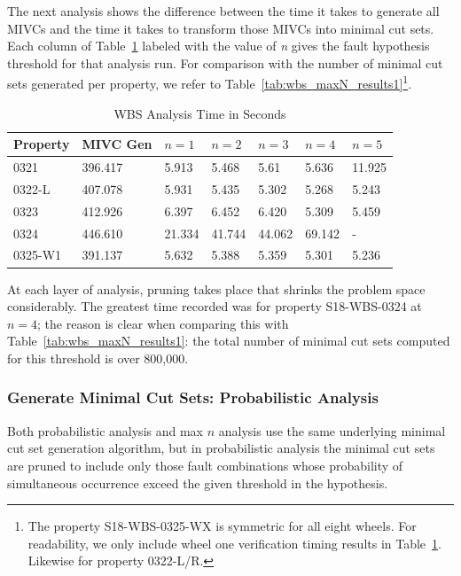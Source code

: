 The next analysis shows the difference between the time it takes to generate all MIVCs and the time it takes to transform those MIVCs into minimal cut sets. Each column of Table~\ref{tab:wbs_mincut1} labeled with the value of \textit{n} gives the fault hypothesis threshold for that analysis run. For comparison with the number of minimal cut sets generated per property, we refer to Table~\ref{tab:wbs_maxN_results1}\footnote{The property S18-WBS-0325-WX is symmetric for all eight wheels. For readability, we only include wheel one verification timing results in Table~\ref{tab:wbs_mincut1}. Likewise for property 0322-L/R.}.
\begin{table}[htbp]
\begin{center}
    \begin{tabular}{ | l | l | l | l | l | l | l |}
    \hline
    \textbf{Property} &  MIVC Gen & $n=1$ & $n=2$ & $n=3$ & $n=4$ & $n=5$     \\ \hline \hline
    0321 & 396.417 & 5.913 & 5.468 & 5.61 & 5.636 & 11.925  \\ \hline
    0322-L  & 407.078 & 5.931 & 5.435 & 5.302 & 5.268 & 5.243 \\ \hline
    0323 & 412.926 & 6.397 & 6.452 & 6.420  & 5.309 & 5.459\\ \hline
    0324 & 446.610 & 21.334 & 41.744 & 44.062 & 69.142 & -\\ \hline
    0325-W1 & 391.137 & 5.632 & 5.388 &5.359 &5.301 & 5.236 \\ \hline
    \end{tabular}
    \caption{WBS Analysis Time in Seconds}
    \label{tab:wbs_mincut1}
    \end{center}
\end{table}
At each layer of analysis, pruning takes place that shrinks the problem space considerably. The greatest time recorded was for property S18-WBS-0324 at $n = 4$; the reason is clear when comparing this with Table~\ref{tab:wbs_maxN_results1}: the total number of minimal cut sets computed for this threshold is over 800,000.  

\subsubsection{Generate Minimal Cut Sets: Probabilistic Analysis}
\label{sec:prob_generate}
Both probabilistic analysis and max $n$ analysis use the same underlying minimal cut set generation algorithm, but in probabilistic analysis the minimal cut sets are pruned to include only those fault combinations whose probability of simultaneous occurrence exceed the given threshold in the hypothesis. 

